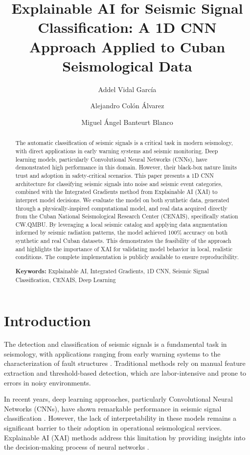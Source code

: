 \documentclass[10pt,a4paper]{article}
\title{Explainable AI for Seismic Signal Classification: A 1D CNN Approach Applied to Cuban Seismological Data}
\author[1]{Addel Vidal García}
\author[1]{Alejandro Colón Álvarez}
\author[1]{Miguel Ángel Banteurt Blanco}
\affil[1]{Facultad de Ingeniería Informática, Universidad de las Ciencias Informáticas, La Habana, Cuba}
\date{}
\newcommand{\keywords}[1]{\par\noindent\textbf{Keywords:} #1\par}
\begin{document}
\maketitle

\begin{abstract}
\noindent The automatic classification of seismic signals is a critical task in modern seismology, with direct applications in early warning systems and seismic monitoring. Deep learning models, particularly Convolutional Neural Networks (CNNs), have demonstrated high performance in this domain. However, their black-box nature limits trust and adoption in safety-critical scenarios. This paper presents a 1D CNN architecture for classifying seismic signals into noise and seismic event categories, combined with the Integrated Gradients method from Explainable AI (XAI) to interpret model decisions. We evaluate the model on both synthetic data, generated through a physically-inspired computational model, and real data acquired directly from the Cuban National Seismological Research Center (CENAIS), specifically station CW.QMBU. By leveraging a local seismic catalog and applying data augmentation informed by seismic radiation patterns, the model achieved 100\% accuracy on both synthetic and real Cuban datasets. This demonstrates the feasibility of the approach and highlights the importance of XAI for validating model behavior in local, realistic conditions. The complete implementation is publicly available to ensure reproducibility.

\vspace{0.5em}
\noindent\keywords{Explainable AI, Integrated Gradients, 1D CNN, Seismic Signal Classification, CENAIS, Deep Learning}
\end{abstract}

\section{Introduction}

The detection and classification of seismic signals is a fundamental task in seismology, with applications ranging from early warning systems to the characterization of fault structures \cite{mousavi2019stead}. Traditional methods rely on manual feature extraction and threshold-based detection, which are labor-intensive and prone to errors in noisy environments.

In recent years, deep learning approaches, particularly Convolutional Neural Networks (CNNs), have shown remarkable performance in seismic signal classification \cite{ieee2024cnn, ieee2025seismic}. However, the lack of interpretability in these models remains a significant barrier to their adoption in operational seismological services. Explainable AI (XAI) methods address this limitation by providing insights into the decision-making process of neural networks \cite{sundararajan2017axiomatic}.
\end{document}
